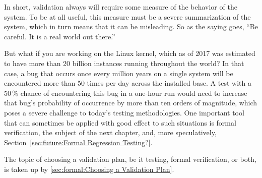 In short, validation always will require some measure of the behavior of
the system.
To be at all useful, this measure must be a severe summarization of the
system, which in turn means that it can be misleading.
So as the saying goes, ``Be careful.  It is a real world out there.''

But what if you are working on the Linux kernel, which as of 2017 was
estimated to have more than 20 billion instances running throughout
the world?
In that case, a bug that occurs once every million years on a single system
will be encountered more than 50 times per day across the installed base.
A test with a 50\,\% chance of encountering this bug in a one-hour run
would need to increase that bug's probability of occurrence by more than
ten orders of magnitude, which poses a severe challenge to
today's testing methodologies.
One important tool that can sometimes be applied with good effect to
such situations is formal verification, the subject of the next chapter,
and, more speculatively, Section~\ref{sec:future:Formal Regression Testing?}.

The topic of choosing a validation plan, be it testing, formal
verification, or both, is taken up by
\cref{sec:formal:Choosing a Validation Plan}.



